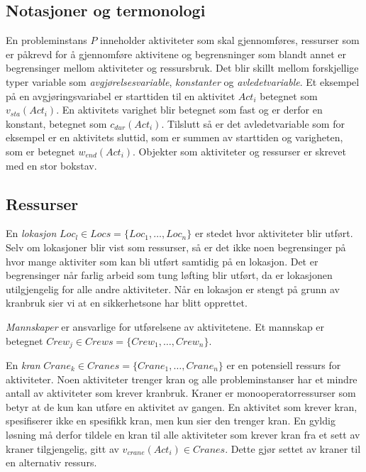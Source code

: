\subsection{Notasjoner og termonologi}
En probleminstans $ P $ inneholder aktiviteter som skal gjennomføres, ressurser som er påkrevd for å gjennomføre aktivitene og begrensninger som blandt annet er begrensinger mellom aktiviteter og ressursbruk. Det blir skillt mellom forskjellige typer variable som \textit{avgjørelsesvariable}, \textit{konstanter} og \textit{avledetvariable}. Et eksempel på en avgjøringsvariabel er starttiden til en aktivitet $ Act_{i} $ betegnet som $ v_{sta}(Act_{i}) $. En aktivitets varighet blir betegnet som fast og er derfor en konstant, betegnet som $ c_{dur}(Act_{i}) $. Tilslutt så er det avledetvariable som for eksempel er en aktivitets sluttid, som er summen av starttiden og varigheten, som er betegnet $ w_{end}(Act_{i}) $. Objekter som aktiviteter og ressurser er skrevet med en stor bokstav.

\subsection{Ressurser}
En \textit{lokasjon} $ Loc_{l} \in Locs = \{ Loc_{1},\dots,Loc_{n} \} $ er stedet hvor aktiviteter blir utført. Selv om lokasjoner blir vist som ressurser, så er det ikke noen begrensinger på hvor mange aktiviter som kan bli utført samtidig på en lokasjon. Det er begrensinger når farlig arbeid som tung løfting blir utført, da er lokasjonen utilgjengelig for alle andre aktiviteter. Når en lokasjon er stengt på grunn av kranbruk sier vi at en sikkerhetsone har blitt opprettet.

\textit{Mannskaper} er ansvarlige for utførelsene av aktivitetene. Et mannskap er betegnet $ Crew_{j} \in Crews = \{ Crew_{1},\dots,Crew_{n} \} $.

En \textit{kran} $ Crane_{k} \in Cranes = \{ Crane_{1},\dots,Crane_{n} \} $ er en potensiell ressurs for aktiviteter. Noen aktiviteter trenger kran og alle probleminstanser har et mindre antall av aktiviteter som krever kranbruk. Kraner er monooperatorressurser  som betyr at de kun kan utføre en aktivitet av gangen. En aktivitet som krever kran, spesifiserer ikke en spesifikk kran, men kun sier den trenger kran. En gyldig løsning må derfor tildele en kran til alle aktiviteter som krever kran fra et sett av kraner tilgjengelig, gitt av $ v_{crane}(Act_{i}) \in Cranes $. Dette gjør settet av kraner til en alternativ ressurs.

